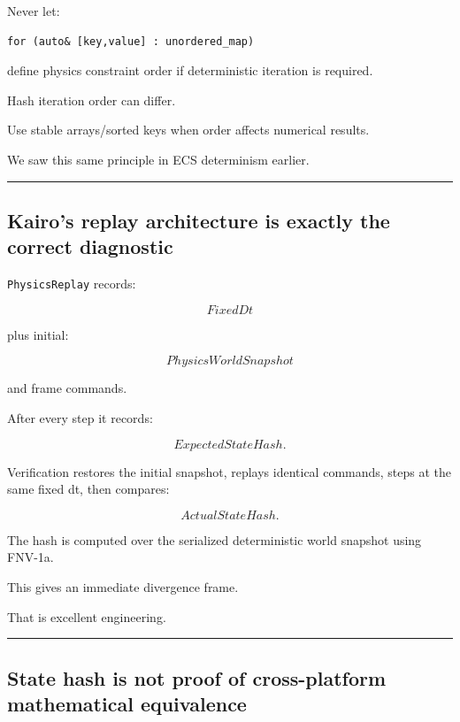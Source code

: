 Never let:

\begin{verbatim}
for (auto& [key,value] : unordered_map)
\end{verbatim}

define physics constraint order if deterministic iteration is required.

Hash iteration order can differ.

Use stable arrays/sorted keys when order affects numerical results.

We saw this same principle in ECS determinism earlier.

\begin{center}\rule{0.5\linewidth}{0.5pt}\end{center}

\subsection{Kairo's replay architecture is exactly the correct diagnostic}\label{06-engine-ii-ch039-kairos-replay-architecture-is-exactly-the-correct-diagnostic}

\texttt{PhysicsReplay} records:

\[
FixedDt
\]

plus initial:

\[
PhysicsWorldSnapshot
\]

and frame commands.

After every step it records:

\[
ExpectedStateHash.
\]

Verification restores the initial snapshot, replays identical commands, steps at the same fixed dt, then compares:

\[
ActualStateHash.
\]

The hash is computed over the serialized deterministic world snapshot using FNV-1a.

This gives an immediate divergence frame.

That is excellent engineering.

\begin{center}\rule{0.5\linewidth}{0.5pt}\end{center}

\subsection{State hash is not proof of cross-platform mathematical equivalence}\label{06-engine-ii-ch039-state-hash-is-not-proof-of-cross-platform-mathematical-equivalence}

